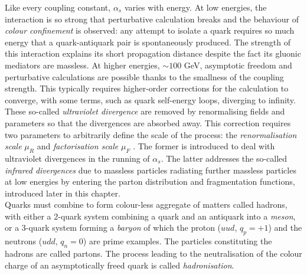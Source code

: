 Like every coupling constant, $\alpha_s$ varies with energy. At low energies, the interaction is so strong that perturbative calculation breaks and the behaviour of \textit{colour confinement} is observed: any attempt to isolate a quark requires so much energy that a quark-antiquark pair is spontaneously produced. The strength of this interaction explains its short propagation distance despite the fact its gluonic mediators are massless. At higher energies, $\sim 100$ GeV, asymptotic freedom and perturbative calculations are possible thanks to the smallness of the coupling strength. This typically requires higher-order corrections for the calculation to converge, with some terms, such as quark self-energy loops, diverging to infinity. These so-called \textit{ultraviolet divergence} are removed by renormalising fields and parameters so that the divergences are absorbed away. This correction requires two parameters to arbitrarily define the scale of the process: the \textit{renormalisation scale} $\mu_R$ and \textit{factorisation scale} $\mu_F$ \cite{collins2004factorization}. The former is introduced to deal with ultraviolet divergences in the running of $\alpha_s$. The latter addresses the so-called \textit{infrared divergences} due to massless particles radiating further massless particles at low energies by entering the parton distribution and fragmentation functions, introduced later in this chapter.\\

Quarks must combine to form colour-less aggregate of matters called hadrons, with either a 2-quark system combining a quark and an antiquark into a \textit{meson}, or a 3-quark system forming a \textit{baryon} of which the proton ($uud$, $q_p = +1$) and the neutrons ($udd$, $q_n = 0$) are prime examples. The particles constituting the hadrons are called partons. The process leading to the neutralisation of the colour charge of an asymptotically freed quark is called \textit{hadronisation}.\\

